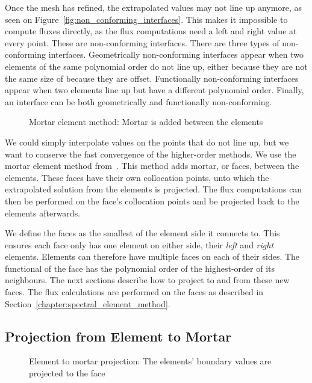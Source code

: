 Once the mesh has refined, the extrapolated values may not line up anymore, as seen on
Figure~\ref{fig:non_conforming_interfaces}. This makes it impossible to compute fluxes directly, as
the flux computations need a left and right value at every point. These are non-conforming
interfaces. There are three types of non-conforming interfaces. Geometrically non-conforming
interfaces appear when two elements of the same polynomial order do not line up, either because they
are not the same size of because they are offset. Functionally non-conforming interfaces appear when
two elements line up but have a different polynomial order. Finally, an interface can be both
geometrically and functionally non-conforming.

\begin{figure}[H]
	\centering
	
	\caption{Mortar element method: Mortar is added between the elements}
	\label{fig:mortar_element_method}
\end{figure}

We could simply interpolate values on the points that do not line up, but we want to conserve the
fast convergence of the higher-order methods. We use the mortar element method
from~\cite{Maday1989}. This method adds mortar, or faces, between the elements. These faces have
their own collocation points, unto which the extrapolated solution from the elements is projected.
The flux computations can then be performed on the face's collocation points and be projected back
to the elements afterwards.

We define the faces as the smallest of the element side it connects to. This ensures each face only
has one element on either side, their \textit{left} and \textit{right} elements. Elements can
therefore have multiple faces on each of their sides. The functional of the face has the polynomial
order of the highest-order of its neighbours. The next sections describe how to project to and from
these new faces. The flux calculations are performed on the faces as described in
Section~\ref{chapter:spectral_element_method}. 

\subsection{Projection from Element to Mortar} \label{section:adaptive_mesh_refinement:mortar_element_method:element_to_mortar}

\begin{figure}[H]
	\centering
	
	\caption{Element to mortar projection: The elements' boundary values are projected to the face}
	\label{fig:element_to_mortar}
\end{figure}


